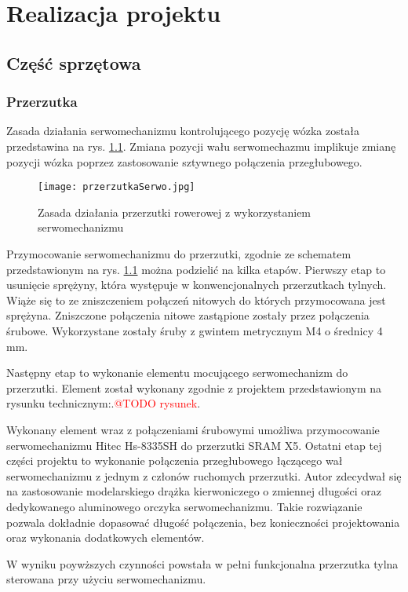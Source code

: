 \chapter{Realizacja projektu}
\section{Część sprzętowa}
\subsection{Przerzutka }
 Zasada działania serwomechanizmu kontrolującego pozycję wózka została przedstawina na rys. \ref{fig:przerzutkaSerwo}. Zmiana pozycji wału serwomechazmu implikuje zmianę pozycji wózka poprzez zastosowanie sztywnego połączenia przegłubowego.
 \begin{figure}[h]
    \centering
    \texttt{[image: przerzutkaSerwo.jpg]}
    \caption{Zasada działania przerzutki rowerowej z wykorzystaniem serwomechanizmu}
    \label{fig:przerzutkaSerwo}
\end{figure}

Przymocowanie serwomechanizmu do przerzutki, zgodnie ze schematem przedstawionym na rys. \ref{fig:przerzutkaSerwo}  można podzielić na kilka etapów.
Pierwszy etap to usunięcie sprężyny, która występuje w konwencjonalnych przerzutkach tylnych. Wiąże się to ze zniszczeniem połączeń nitowych do których przymocowana jest sprężyna. Zniszczone połączenia nitowe zastąpione zostały przez połączenia śrubowe. Wykorzystane zostały śruby z gwintem metrycznym M4 o średnicy 4 mm.

Następny etap to wykonanie elementu mocującego serwomechanizm do przerzutki. Element został wykonany zgodnie z projektem przedstawionym na rysunku technicznym:.\textcolor{red}{@TODO rysunek}.

Wykonany element wraz z połączeniami śrubowymi umożliwa przymocowanie serwomechanizmu Hitec Hs-8335SH do przerzutki SRAM X5. Ostatni etap tej części projektu to wykonanie połączenia przegłubowego łączącego wał serwomechanizmu z jednym z członów ruchomych przerzutki. Autor zdecydwał się na zastosowanie modelarskiego drążka kierwoniczego o zmiennej długości oraz dedykowanego aluminowego orczyka serwomechanizmu. Takie rozwiązanie pozwala dokładnie dopasować długość  połączenia, bez konieczności projektowania oraz wykonania dodatkowych elementów.

W wyniku poywższych czynności powstała w pełni funkcjonalna przerzutka tylna sterowana przy użyciu serwomechanizmu. 

